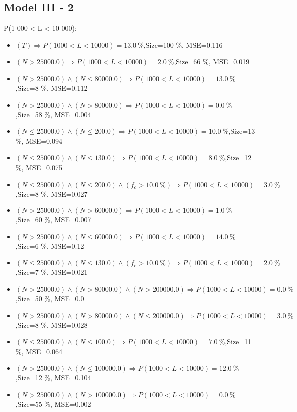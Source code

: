 \documentclass[numbered]{CSL}
\begin{document}
\subsection{Model III - 2}
P(1 000 < L < 10 000):
\begin{itemize}
\item $(T) \Rightarrow P(1 000 < L < 10 000) = 13.0~\%$,\hfill Size=100 \%, MSE=0.116
\item $(N > 25000.0) \Rightarrow P(1 000 < L < 10 000) = 2.0~\%$,\hfill Size=66 \%, MSE=0.019
\item $(N > 25000.0) \land (N \leq 80000.0) \Rightarrow P(1 000 < L < 10 000) = 13.0~\%$,\hfill Size=8 \%, MSE=0.112
\item $(N > 25000.0) \land (N > 80000.0) \Rightarrow P(1 000 < L < 10 000) = 0.0~\%$,\hfill Size=58 \%, MSE=0.004
\item $(N \leq 25000.0) \land (N \leq 200.0) \Rightarrow P(1 000 < L < 10 000) = 10.0~\%$,\hfill Size=13 \%, MSE=0.094
\item $(N \leq 25000.0) \land (N \leq 130.0) \Rightarrow P(1 000 < L < 10 000) = 8.0~\%$,\hfill Size=12 \%, MSE=0.075
\item $(N \leq 25000.0) \land (N \leq 200.0) \land (f_c > 10.0~\%) \Rightarrow P(1 000 < L < 10 000) = 3.0~\%$,\hfill Size=8 \%, MSE=0.027
\item $(N > 25000.0) \land (N > 60000.0) \Rightarrow P(1 000 < L < 10 000) = 1.0~\%$,\hfill Size=60 \%, MSE=0.007
\item $(N > 25000.0) \land (N \leq 60000.0) \Rightarrow P(1 000 < L < 10 000) = 14.0~\%$,\hfill Size=6 \%, MSE=0.12
\item $(N \leq 25000.0) \land (N \leq 130.0) \land (f_c > 10.0~\%) \Rightarrow P(1 000 < L < 10 000) = 2.0~\%$,\hfill Size=7 \%, MSE=0.021
\item $(N > 25000.0) \land (N > 80000.0) \land (N > 200000.0) \Rightarrow P(1 000 < L < 10 000) = 0.0~\%$,\hfill Size=50 \%, MSE=0.0
\item $(N > 25000.0) \land (N > 80000.0) \land (N \leq 200000.0) \Rightarrow P(1 000 < L < 10 000) = 3.0~\%$,\hfill Size=8 \%, MSE=0.028
\item $(N \leq 25000.0) \land (N \leq 100.0) \Rightarrow P(1 000 < L < 10 000) = 7.0~\%$,\hfill Size=11 \%, MSE=0.064
\item $(N > 25000.0) \land (N \leq 100000.0) \Rightarrow P(1 000 < L < 10 000) = 12.0~\%$,\hfill Size=12 \%, MSE=0.104
\item $(N > 25000.0) \land (N > 100000.0) \Rightarrow P(1 000 < L < 10 000) = 0.0~\%$,\hfill Size=55 \%, MSE=0.002

\end{itemize}
\end{document}
